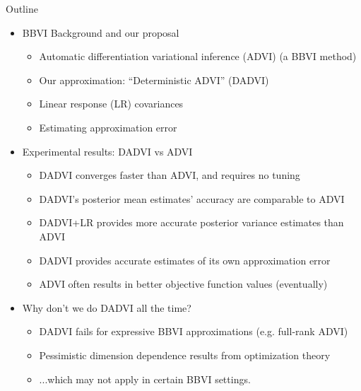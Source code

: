 \documentclass[8pt]{beamer}\usepackage[]{graphicx}\usepackage[]{color}
\begin{document}

\begin{frame}{Outline}
%
\begin{itemize}
    \item BBVI Background and our proposal
    \begin{itemize}
        \item Automatic differentiation variational inference (ADVI) (a BBVI method)
        \item Our approximation: ``Deterministic ADVI'' (DADVI)
        \item Linear response (LR) covariances
        \item Estimating approximation error
    \end{itemize}
    \item Experimental results: DADVI vs ADVI
    \begin{itemize}
        \item DADVI converges faster than ADVI, and requires no tuning
        \item DADVI's posterior mean estimates' accuracy are comparable to ADVI
        \item DADVI+LR provides more accurate posterior variance estimates than ADVI
        \item DADVI provides accurate estimates of its own approximation error
        \item ADVI often results in better objective function values (eventually)
    \end{itemize}
    \item Why don't we do DADVI all the time?
    \begin{itemize}
        \item DADVI fails for expressive BBVI approximations (e.g. full-rank ADVI)
        \item Pessimistic dimension dependence results from optimization theory
        \item ...which may not apply in certain BBVI settings.
    \end{itemize}
\end{itemize}
%
\end{frame}

\end{document}
